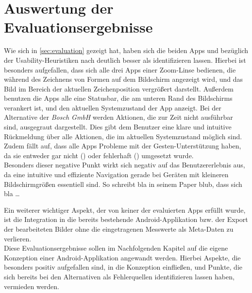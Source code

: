 



\section{Auswertung der Evaluationsergebnisse}

Wie sich in \autoref{sec:evaluation} gezeigt hat, haben sich die beiden Apps \mm{} und \pm{} bezüglich der Usability-Heuristiken nach \citeauthor{Nielsen94} deutlich besser als \ms{} identifizieren lassen. 
Hierbei ist besonders aufgefallen, dass sich alle drei Apps einer Zoom-Linse bedienen, die während des Zeichnens von Formen auf dem Bildschirm angezeigt wird, und das Bild im Bereich der aktuellen Zeichenposition vergrößert darstellt.
Außerdem benutzen die Apps alle eine Statusbar, die am unteren Rand des Bildschirms verankert ist, und den aktuellen Systemzustand der App anzeigt.
Bei der Alternative der \emph{Bosch GmbH} werden Aktionen, die zur Zeit nicht ausführbar sind, ausgegraut dargestellt. Dies gibt dem Benutzer eine klare und intuitive Rückmeldung über alle Aktionen, die im aktuellen Systemzustand möglich sind.
Zudem fällt auf, dass alle Apps Probleme mit der Gesten-Unterstützung haben, da sie entweder gar nicht () oder fehlerhaft () umgesetzt wurde. \\
Besonders dieser negative Punkt wirkt sich negativ auf das Benutzererlebnis aus, da eine intuitive und effiziente Navigation gerade bei Geräten mit kleineren Bildschirmgrößen essentiell sind. 
So schreibt bla in seinem Paper blub, dass sich bla \dots

Ein weiterer wichtiger Aspekt, der von keiner der evaluierten Apps erfüllt wurde, ist die Integration in die bereits bestehende Android-Applikation bzw. der Export der bearbeiteten Bilder ohne die eingetragenen Messwerte als Meta-Daten zu verlieren. \\

Diese Evaluationsergebnisse sollen im Nachfolgenden Kapitel auf die eigene Konzeption einer Android-Applikation angewandt werden.
Hierbei Aspekte, die besonders positiv aufgefallen sind, in die Konzeption einfließen, und Punkte, die sich bereits bei den Alternativen als Fehlerquellen identifizieren lassen haben, vermieden werden.
